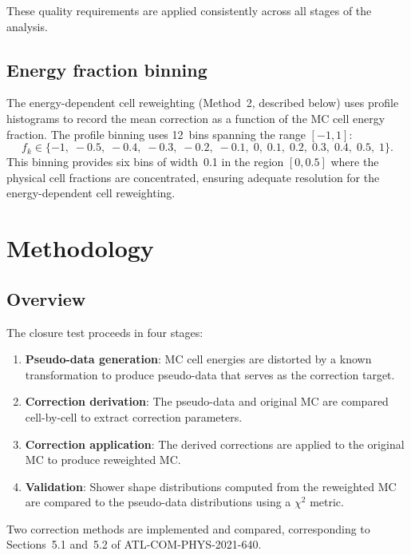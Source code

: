 \documentclass[12pt,a4paper]{article}
\begin{document}
These quality requirements are applied consistently across all stages of the
analysis.

\subsection{Energy fraction binning}
\label{sec:data:fracbins}

The energy-dependent cell reweighting (Method~2, described below) uses profile
histograms to record the mean correction as a function of the MC cell energy
fraction. The profile binning uses 12~bins spanning the range $[-1,1]$:
\begin{equation}
  f_k \in
  \{-1,\;-0.5,\;-0.4,\;-0.3,\;-0.2,\;-0.1,\;0,\;0.1,\;0.2,\;0.3,\;0.4,\;0.5,\;1\}.
  \label{eq:fracbins}
\end{equation}
This binning provides six bins of width~0.1 in the region $[0,0.5]$ where
the physical cell fractions are concentrated, ensuring adequate resolution for
the energy-dependent cell reweighting.

\section{Methodology}
\label{sec:method}

\subsection{Overview}
\label{sec:method:overview}

The closure test proceeds in four stages:
\begin{enumerate}
  \item \textbf{Pseudo-data generation}: MC cell energies are distorted by a
        known transformation to produce pseudo-data that serves as the
        correction target.
  \item \textbf{Correction derivation}: The pseudo-data and original MC are
        compared cell-by-cell to extract correction parameters.
  \item \textbf{Correction application}: The derived corrections are applied
        to the original MC to produce reweighted MC.
  \item \textbf{Validation}: Shower shape distributions computed from the
        reweighted MC are compared to the pseudo-data distributions using a
        $\chi^2$ metric.
\end{enumerate}
Two correction methods are implemented and compared, corresponding to
Sections~5.1 and~5.2 of ATL-COM-PHYS-2021-640.
\end{document}
